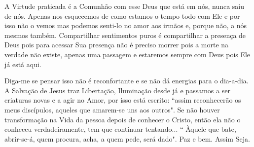\emdash{}A Virtude praticada é a Comunhão com esse Deus que está em nós, nunca saiu de nós. Apenas nos esquecemos de como estamos o tempo todo com Ele e por isso não o vemos mas podemos senti-lo no amor aos irmãos e, porque não, a nós mesmos também. Compartilhar sentimentos puros é compartilhar a presença de Deus pois para acessar Sua presença não é preciso morrer pois a morte na verdade não existe, apenas uma passagem e estaremos sempre com Deus pois Ele já está aqui.

\emdash{}Diga-me se pensar isso não é reconfortante e se não dá energias para o dia-a-dia. A Salvação de Jesus traz Libertação, Iluminação desde já e passamos a ser criaturas novas e a agir no Amor, por isso está escrito: ``assim reconhecerão os meus discípulos, aqueles que amarem-se uns aos outros". Se não houver transformação na Vida da pessoa depois de conhecer o Cristo, então ela não o conheceu verdadeiramente, tem que continuar tentando... `` Àquele que bate, abrir-se-á, quem procura, acha, a quem pede, será dado". Paz e bem. Assim Seja.